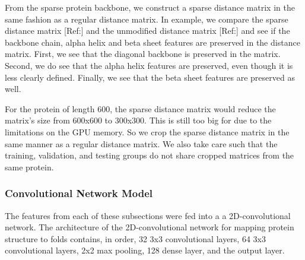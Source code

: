 \documentclass[12pt, a4paper, twocolumn, fullpage]{article}
\theoremstyle{plain}
\theoremstyle{definition}
\theoremstyle{remark}
\begin{document}
From the sparse protein backbone, we construct a sparse distance matrix in the same fashion as a regular distance matrix. In example, we compare the sparse distance matrix [Ref:] and the unmodified distance matrix [Ref:] and see if the backbone chain, alpha helix and beta sheet features are preserved in the distance matrix. First, we see that the diagonal backbone is preserved in the matrix. Second, we do see that the alpha helix features are preserved, even though it is less clearly defined. Finally, we see that the beta sheet features are preserved as well.

For the protein of length 600, the sparse distance matrix would reduce the matrix's size from 600x600 to 300x300. This is still too big for due to the limitations on the GPU memory. So we crop the sparse distance matrix in the same manner as a regular distance matrix. We also take care such that the training, validation, and testing groups do not share cropped matrices from the same protein.

\subsubsection{Convolutional Network Model}

The features from each of these subsections were fed into a a 2D-convolutional network. The architecture of the 2D-convolutional network for mapping protein structure to folds contains, in order, 32 3x3 convolutional layers, 64 3x3 convolutional layers, 2x2 max pooling, 128 dense layer, and the output layer.
\end{document}
